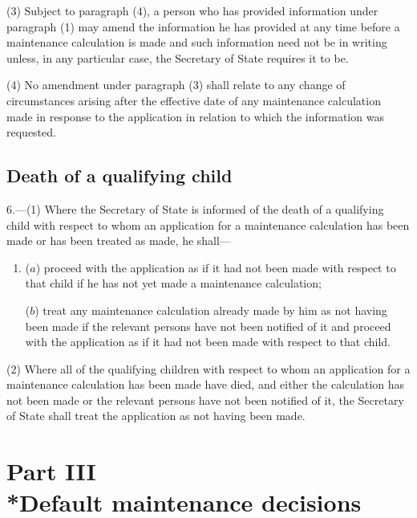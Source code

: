 \documentclass[12pt,a4paper]{article}
\begin{document}
(3) Subject to paragraph (4), a person who has provided information under paragraph (1) may amend the information he has provided at any time before a maintenance calculation is made and such information need not be in writing unless, in any particular case, the Secretary of State requires it to be.

(4) No amendment under paragraph (3) shall relate to any change of circumstances arising after the effective date of any maintenance calculation made in response to the application in relation to which the information was requested.


\subsection[6. Death of a qualifying child]{Death of a qualifying child}

6.---(1)  Where the Secretary of State is informed of the death of a qualifying child with respect to whom an application for a maintenance calculation has been made or has been treated as made, he shall—
\begin{enumerate}\item[]
($a$) proceed with the application as if it had not been made with respect to that child if he has not yet made a maintenance calculation;

($b$) treat any maintenance calculation already made by him as not having been made if the relevant persons have not been notified of it and proceed with the application as if it had not been made with respect to that child.
\end{enumerate}

(2) Where all of the qualifying children with respect to whom an application for a maintenance calculation has been made have died, and either the calculation has not been made or the relevant persons have not been notified of it, the Secretary of State shall treat the application as not having been made.

\section[Part III --- Default maintenance decisions]{Part III\\*Default maintenance decisions}

\renewcommand\parthead{--- Part III}
\end{document}
